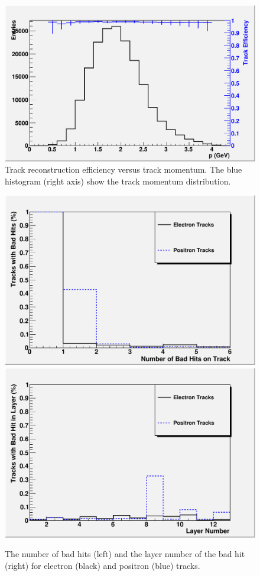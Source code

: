 \begin{figure}
\includegraphics[scale=0.8]{performance/tracking_performance/pzE-Effic.pdf}
\caption{ Track reconstruction efficiency versus track momentum.  The blue histogram (right axis) show the track momentum distribution.  }
\label{fig:trkeffic}
\end{figure}

\begin{figure}
\includegraphics[scale=0.4]{performance/tracking_performance/nBadHits.pdf}
\includegraphics[scale=0.4]{performance/tracking_performance/BadLayer.pdf}
\caption{ The number of bad hits (left) and the layer number of the bad hit (right) 
for electron (black) and positron (blue) tracks.   }
\label{fig:badhits}
\end{figure}


